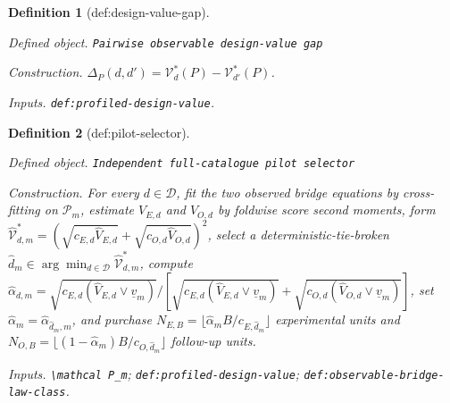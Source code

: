 \documentclass{article}
\newtheorem{definition}{Definition}
\begin{document}
\begin{definition}[def:design-value-gap]\label{def:design-value-gap}
\par\smallskip\noindent\emph{Defined object.} \texttt{Pairwise observable design-\allowbreak{}value gap}
\par\smallskip\noindent\emph{Construction.} \(\Delta_P(d,d')=\mathcal V_d^*(P)-\mathcal V_{d'}^*(P)\).
\par\smallskip\noindent\emph{Inputs.} \texttt{def:\allowbreak{}profiled-\allowbreak{}design-\allowbreak{}value}.
\end{definition}

\begin{definition}[def:pilot-selector]\label{def:pilot-selector}
\par\smallskip\noindent\emph{Defined object.} \texttt{Independent full-\allowbreak{}catalogue pilot selector}
\par\smallskip\noindent\emph{Construction.} For every \(d\in\mathcal D\), fit the two observed bridge equations by cross-fitting on \(\mathcal P_m\), estimate \(V_{E,d}\) and \(V_{O,d}\) by foldwise score second moments, form \(\widehat{\mathcal V}_{d,m}^*=(\sqrt{c_{E,d}\widehat V_{E,d}}+\sqrt{c_{O,d}\widehat V_{O,d}})^2\), select a deterministic-tie-broken \(\widehat d_m\in\arg\min_{d\in\mathcal D}\widehat{\mathcal V}_{d,m}^*\), compute \(\widehat\alpha_{d,m}=\sqrt{c_{E,d}(\widehat V_{E,d}\vee\underline v_m)}/[\sqrt{c_{E,d}(\widehat V_{E,d}\vee\underline v_m)}+\sqrt{c_{O,d}(\widehat V_{O,d}\vee\underline v_m)}]\), set \(\widehat\alpha_m=\widehat\alpha_{\widehat d_m,m}\), and purchase \(N_{E,B}=\lfloor\widehat\alpha_mB/c_{E,\widehat d_m}\rfloor\) experimental units and \(N_{O,B}=\lfloor(1-\widehat\alpha_m)B/c_{O,\widehat d_m}\rfloor\) follow-up units.
\par\smallskip\noindent\emph{Inputs.} \texttt{\textbackslash{}\allowbreak{}mathcal P\_\allowbreak{}m}; \texttt{def:\allowbreak{}profiled-\allowbreak{}design-\allowbreak{}value}; \texttt{def:\allowbreak{}observable-\allowbreak{}bridge-\allowbreak{}law-\allowbreak{}class}.
\end{definition}
\end{document}
